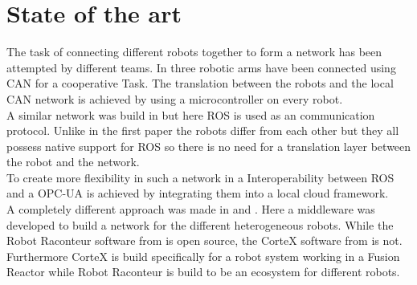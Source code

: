 \documentclass[conference]{IEEEtran}
\begin{document}
\section{State of the art}
The task of connecting different robots together to form a network has been attempted by different teams.
In \cite{SotaCAN} three robotic arms have been connected using CAN for a cooperative Task.
The translation between the robots and the local CAN network is achieved by using a microcontroller on every robot.\\
A similar network was build in \cite{SotaROS} but here ROS is used as an communication protocol.
Unlike in the first paper the robots differ from each other but they all possess native support for ROS so there is no need for a translation layer between the robot and the network.\\
To create more flexibility in such a network in \cite{StoaROStoOPCUA} a Interoperability between ROS and a OPC-UA is achieved by integrating them into a local cloud framework.\\
A completely different approach was made in \cite{SotaRaconteur} and \cite{SotaFusion}.
Here a middleware was developed to build a network for the different heterogeneous robots.
While the Robot Raconteur software from \cite{SotaRaconteur} is open source, the CorteX software from \cite{SotaFusion} is not.
Furthermore CorteX is build specifically for a robot system working in a Fusion Reactor while Robot Raconteur is build to be an ecosystem for different robots.

\end{document}

